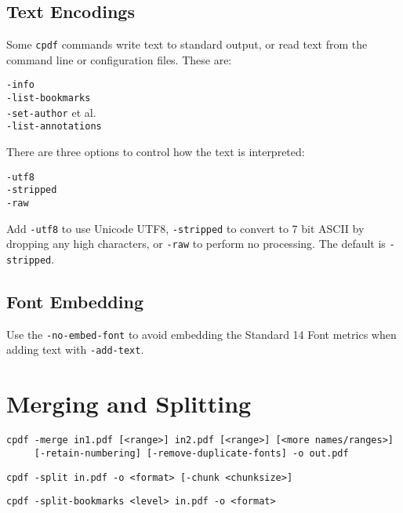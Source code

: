\documentclass{book}
\begin{document}
\section{Text Encodings}

Some \texttt{cpdf} commands write text to standard output, or read text from
the command line or configuration files. These are:

\begin{framed}
  \noindent\small\verb!-info!\\
  \noindent\small\verb!-list-bookmarks!\\
  \noindent\small\verb!-set-author! et al.\\
  \noindent\small\verb!-list-annotations!
\end{framed}

\noindent There are three options to control how the text is interpreted:

\begin{framed}
  \noindent\small\verb!-utf8!\\
  \noindent\small\verb!-stripped!\\
  \noindent\small\verb!-raw!
\end{framed}

\noindent Add \verb!-utf8! to use Unicode UTF8, \verb!-stripped! to convert to 7
bit ASCII by dropping any high characters, or \verb!-raw! to perform no
processing. The default is \verb!-stripped!.

\section{Font Embedding}
Use the \texttt{-no-embed-font} to avoid embedding the Standard 14 Font metrics when adding text with \texttt{-add-text}.

\chapter{Merging and Splitting}
  \begin{framed}
  \small
  \noindent\begin{verbatim}
cpdf -merge in1.pdf [<range>] in2.pdf [<range>] [<more names/ranges>]
     [-retain-numbering] [-remove-duplicate-fonts] -o out.pdf\end{verbatim}

  \vspace{1.5mm}
  \noindent\verb!cpdf -split in.pdf -o <format> [-chunk <chunksize>]!

  \vspace{1.5mm}
  \noindent\verb!cpdf -split-bookmarks <level> in.pdf -o <format>!
  \end{framed}
\end{document}
